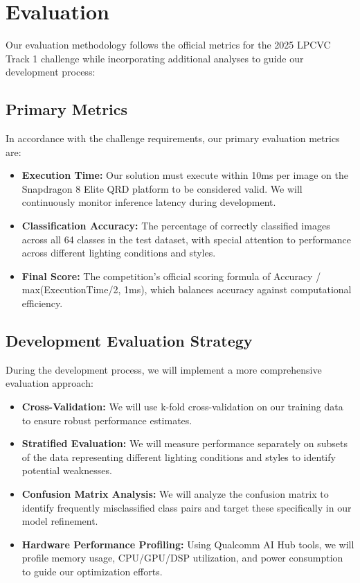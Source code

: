 \documentclass[11pt, oneside]{article}   	%
\begin{document}
\section*{Evaluation}

Our evaluation methodology follows the official metrics for the 2025 LPCVC Track 1 challenge while incorporating additional analyses to guide our development process:

\subsection*{Primary Metrics}

In accordance with the challenge requirements, our primary evaluation metrics are:

\begin{itemize}
	\item \textbf{Execution Time:} Our solution must execute within 10ms per image on the Snapdragon 8 Elite QRD platform to be considered valid. We will continuously monitor inference latency during development.

	\item \textbf{Classification Accuracy:} The percentage of correctly classified images across all 64 classes in the test dataset, with special attention to performance across different lighting conditions and styles.

	\item \textbf{Final Score:} The competition's official scoring formula of Accuracy / max(ExecutionTime/2, 1ms), which balances accuracy against computational efficiency.
\end{itemize}

\subsection*{Development Evaluation Strategy}

During the development process, we will implement a more comprehensive evaluation approach:

\begin{itemize}
	\item \textbf{Cross-Validation:} We will use k-fold cross-validation on our training data to ensure robust performance estimates.

	\item \textbf{Stratified Evaluation:} We will measure performance separately on subsets of the data representing different lighting conditions and styles to identify potential weaknesses.

	\item \textbf{Confusion Matrix Analysis:} We will analyze the confusion matrix to identify frequently misclassified class pairs and target these specifically in our model refinement.

	\item \textbf{Hardware Performance Profiling:} Using Qualcomm AI Hub tools, we will profile memory usage, CPU/GPU/DSP utilization, and power consumption to guide our optimization efforts.
\end{itemize}
\end{document}
